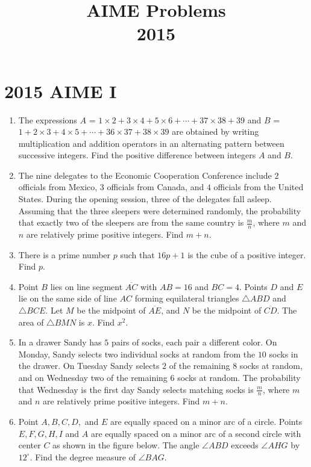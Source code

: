 \documentclass{article}
\title{AIME Problems \\ 2015}
\date{}
\begin{document}
\maketitle\thispagestyle{fancy}\newpage\section*{2015 AIME I}
\begin{enumerate}[label=\arabic*., itemsep=0.5em]
\item The expressions \(A\) = \( 1 \times 2 + 3 \times 4 + 5 \times 6 + \cdots + 37 \times 38 + 39 \) and \(B\) = \( 1 + 2 \times 3 + 4 \times 5 + \cdots + 36 \times 37 + 38 \times 39 \) are obtained by writing multiplication and addition operators in an alternating pattern between successive integers.  Find the positive difference between integers \(A\) and \(B\).\par \vspace{0.5em}\item The nine delegates to the Economic Cooperation Conference include \(2\) officials from Mexico, \(3\) officials from Canada, and \(4\) officials from the United States. During the opening session, three of the delegates fall asleep. Assuming that the three sleepers were determined randomly, the probability that exactly two of the sleepers are from the same country is \(\frac{m}{n}\), where \(m\) and \(n\) are relatively prime positive integers. Find \(m+n\).\par \vspace{0.5em}\item There is a prime number \(p\) such that \(16p+1\) is the cube of a positive integer.  Find \(p\).\par \vspace{0.5em}\item Point \(B\) lies on line segment \(\overline{AC}\) with \(AB=16\) and \(BC=4\). Points \(D\) and \(E\) lie on the same side of line \(AC\) forming equilateral triangles \(\triangle ABD\) and \(\triangle BCE\). Let \(M\) be the midpoint of \(\overline{AE}\), and \(N\) be the midpoint of \(\overline{CD}\). The area of \(\triangle BMN\) is \(x\). Find \(x^2\).\par \vspace{0.5em}\item In a drawer Sandy has \(5\) pairs of socks, each pair a different color.  On Monday, Sandy selects two individual socks at random from the \(10\) socks in the drawer.  On Tuesday Sandy selects \(2\) of the remaining \(8\) socks at random, and on Wednesday two of the remaining \(6\) socks at random.  The probability that Wednesday is the first day Sandy selects matching socks is \(\frac{m}{n}\), where \(m\) and \(n\) are relatively prime positive integers. Find \(m+n\).\par \vspace{0.5em}\item Point \(A,B,C,D,\) and \(E\) are equally spaced on a minor arc of a circle. Points \(E,F,G,H,I\) and \(A\) are equally spaced on a minor arc of a second circle with center \(C\) as shown in the figure below. The angle \(\angle ABD\) exceeds \(\angle AHG\) by \(12^\circ\). Find the degree measure of \(\angle BAG\).



\end{enumerate}
\end{document}
